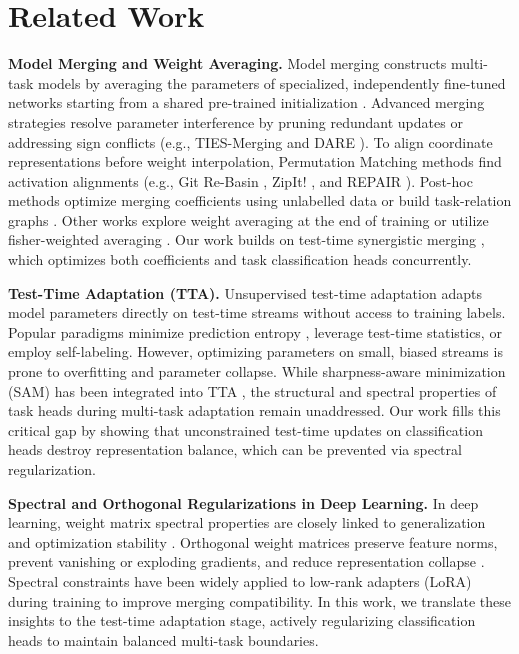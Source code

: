 \documentclass{article}
\theoremstyle{plain}
\theoremstyle{definition}
\theoremstyle{remark}
\begin{document}
\section{Related Work}
\label{sec:related}

\textbf{Model Merging and Weight Averaging.} Model merging constructs multi-task models by averaging the parameters of specialized, independently fine-tuned networks starting from a shared pre-trained initialization \cite{wortsman2022model,ilharco2022editing}. Advanced merging strategies resolve parameter interference by pruning redundant updates or addressing sign conflicts (e.g., TIES-Merging \cite{yadav2023ties} and DARE \cite{yu2024dare}). To align coordinate representations before weight interpolation, Permutation Matching methods find activation alignments (e.g., Git Re-Basin \cite{ainsworth2023git}, ZipIt! \cite{stoica2024zipit}, and REPAIR \cite{jordan2022repair}). Post-hoc methods optimize merging coefficients using unlabelled data \cite{yang2024adamerging} or build task-relation graphs \cite{jang2024merging}. Other works explore weight averaging at the end of training \cite{gu2023model} or utilize fisher-weighted averaging \cite{matena2022merging}. Our work builds on test-time synergistic merging \cite{jung2025symerge}, which optimizes both coefficients and task classification heads concurrently.

\textbf{Test-Time Adaptation (TTA).} Unsupervised test-time adaptation adapts model parameters directly on test-time streams without access to training labels. Popular paradigms minimize prediction entropy \cite{yang2024adamerging}, leverage test-time statistics, or employ self-labeling. However, optimizing parameters on small, biased streams is prone to overfitting and parameter collapse. While sharpness-aware minimization (SAM) has been integrated into TTA \cite{marczak2025sharpness,lee2025mitigating}, the structural and spectral properties of task heads during multi-task adaptation remain unaddressed. Our work fills this critical gap by showing that unconstrained test-time updates on classification heads destroy representation balance, which can be prevented via spectral regularization.

\textbf{Spectral and Orthogonal Regularizations in Deep Learning.} In deep learning, weight matrix spectral properties are closely linked to generalization and optimization stability \cite{hochreiter1997flat,keskar2017large,cha2021swad,izmailov2018averaging}. Orthogonal weight matrices preserve feature norms, prevent vanishing or exploding gradients, and reduce representation collapse \cite{davenport2016introduction,golub2013matrix,horn2012matrix}. Spectral constraints have been widely applied to low-rank adapters (LoRA) during training \cite{hu2022lora} to improve merging compatibility. In this work, we translate these insights to the test-time adaptation stage, actively regularizing classification heads to maintain balanced multi-task boundaries.
\end{document}

